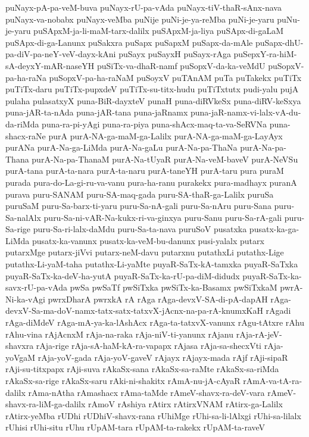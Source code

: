 {puNayx-pA-pa-veM-buva
puNayx-rU-pa-vAda
puNayx-tiV-thaR-sAnx-nava
puNayx-va-nobabx
puNayx-veMba
puNije
puNi-je-ya-reMba
puNi-je-yaru
puNu-je-yaru
puSApxM-ja-li-maM-tarx-dalilx
puSApxM-ja-liya
puSApx-di-gaLaM
puSApx-di-ga-Lanunx
puSakxra
puSapx
puSapxM
puSapx-da-mAle
puSapx-dhU-pa-diV-pa-neY-veV-dayx-kAni
puSayx
puSayxH
puSayx-rAga
puSepxY-ra-hiM-sA-deyxY-mAR-naseYH
puSiTx-va-dhaR-namf
puSopxV-da-ka-veMdU
puSopxV-pa-ha-raNa
puSopxV-pa-ha-raNaM
puSoyxV
puTAnAM
puTa
puTakekx
puTiTx
puTiTx-daru
puTiTx-pupxdeV
puTiTx-su-titx-hudu
puTiTxtutx
pudi-yalu
pujA
pulaha
pulasatxyX
puna-BiR-dayxteV
punaH
puna-diRVkeSx
puna-diRV-keSxya
puna-jAR-ta-nAda
puna-jAR-tana
puna-jaRnamx
puna-jaR-namx-vi-lalx-vA-du-da-riMda
puna-ra-pi-yAgi
puna-ra-piya
puna-shAcx-maq-ta-va-SeRVNa
puna-shacx-raNe
purA
purA-NA-ga-maM-ga-Lalilx
purA-NA-ga-maM-ga-LayAyx
purANa
purA-Na-ga-LiMda
purA-Na-gaLu
purA-Na-pa-ThaNa
purA-Na-pa-Thana
purA-Na-pa-ThanaM
purA-Na-tUyaR
purA-Na-veM-baveV
purA-NeVSu
purA-tana
purA-ta-nara
purA-ta-naru
purA-taneYH
purA-taru
pura
puraM
purada
pura-do-La-gi-ru-va-vanu
pura-ha-ranu
purakekx
pura-madhayx
puranA
purava
puru-SANAM
puru-SA-maq-gada
puru-SA-thaR-ga-Lalilx
puruSa
puruSaM
puru-Sa-barx-ti-yaru
puru-Sa-nA-gali
puru-Sa-nAru
puru-Sana
puru-Sa-nalAlx
puru-Sa-ni-vAR-Na-kukx-ri-va-ginxya
puru-Sanu
puru-Sa-rA-gali
puru-Sa-rige
puru-Sa-ri-lalx-daMdu
puru-Sa-ta-nava
puruSoV
pusatxka
pusatx-ka-ga-LiMda
pusatx-ka-vanunx
pusatx-ka-veM-bu-danunx
pusi-yalalx
putarx
putarxMge
putarx-jiVvi
putarx-neM-davu
putarxnu
putathxLi
putathx-Lige
putathx-Li-yaM-taha
putathx-Li-yaMte
puyaR-SaTx-kA-tamxka
puyaR-SaTxka
puyaR-SaTx-ka-deV-ha-yutA
puyaR-SaTx-ka-rU-pa-diM-didudx
puyaR-SaTx-ka-savx-rU-pa-vAda
pwSa
pwSaTf
pwSiTxka
pwSiTx-ka-Basamx
pwSiTxkaM
pwrA-Ni-ka-vAgi
pwrxDharA
pwrxkA
rA
rAga
rAga-devxV-SA-di-pA-dapAH
rAga-devxV-Sa-ma-doV-namx-tatx-satx-tatxvX-jAcnx-na-pa-rA-knumxKaH
rAgadi
rAga-diMdeV
rAga-mA-ya-ka-lAshAcx
rAga-ta-tatxvX-vanunx
rAgu-tAtxre
rAhu
rAhu-vina
rAjAcnxM
rAja-na-raka
rAja-niV-ti-yanunx
rAjanu
rAja-rA-jeV-shavxra
rAja-rige
rAja-sA-haM-kA-ra-vapapx
rAjasa
rAja-sa-shecxVti
rAja-yoVgaM
rAja-yoV-gada
rAja-yoV-gaveV
rAjayx
rAjayx-mada
rAjf
rAji-sipaR
rAji-su-titxpapx
rAji-suva
rAkaSx-sana
rAkaSx-sa-raMte
rAkaSx-sa-riMda
rAkaSx-sa-rige
rAkaSx-saru
rAki-ni-shakitx
rAmA-nu-jA-cAyaR
rAmA-va-tA-ra-dalilx
rAma-nAtha
rAmashacx
rAma-taMde
rAmeV-shavx-ra-deV-vara
rAmeV-shavx-ra-liM-ga-dalilx
rAmoV
rAshiya
rAtirx
rAtirxVNAM
rAtirx-ga-Lalilx
rAtirx-yeMba
rUDhi
rUDhiV-shavx-rana
rUhiMge
rUhi-sa-li-lAlxgi
rUhi-sa-lilalx
rUhisi
rUhi-situ
rUhu
rUpAM-tara
rUpAM-ta-rakekx
rUpAM-ta-raveV
}
